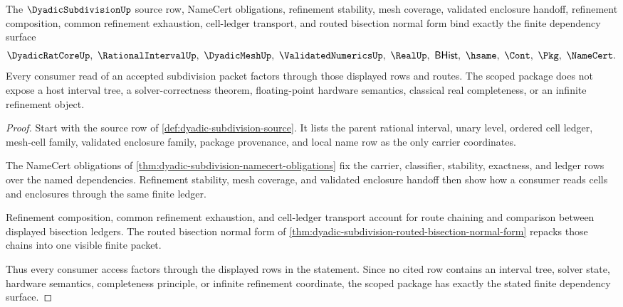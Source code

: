 \begin{theorem}
\label{thm:dyadic-subdivision-scoped-finite-route-package}
The $\DyadicSubdivisionUp$ source row, NameCert obligations, refinement stability, mesh coverage, validated enclosure handoff, refinement composition, common refinement exhaustion, cell-ledger transport, and routed bisection normal form bind exactly the finite dependency surface
$$
\DyadicRatCoreUp,\ \RationalIntervalUp,\ \DyadicMeshUp,\ \ValidatedNumericsUp,\ \RealUp,\ \mathsf{BHist},\ \hsame,\ \Cont,\ \Pkg,\ \NameCert .
$$
Every consumer read of an accepted subdivision packet factors through those displayed rows and routes. The scoped package does not expose a host interval tree, a solver-correctness theorem, floating-point hardware semantics, classical real completeness, or an infinite refinement object.
\end{theorem}
\begin{proof}
Start with the source row of \autoref{def:dyadic-subdivision-source}. It lists the parent rational interval, unary level, ordered cell ledger, mesh-cell family, validated enclosure family, package provenance, and local name row as the only carrier coordinates.

The NameCert obligations of \autoref{thm:dyadic-subdivision-namecert-obligations} fix the carrier, classifier, stability, exactness, and ledger rows over the named dependencies. Refinement stability, mesh coverage, and validated enclosure handoff then show how a consumer reads cells and enclosures through the same finite ledger.

Refinement composition, common refinement exhaustion, and cell-ledger transport account for route chaining and comparison between displayed bisection ledgers. The routed bisection normal form of \autoref{thm:dyadic-subdivision-routed-bisection-normal-form} repacks those chains into one visible finite packet.

Thus every consumer access factors through the displayed rows in the statement. Since no cited row contains an interval tree, solver state, hardware semantics, completeness principle, or infinite refinement coordinate, the scoped package has exactly the stated finite dependency surface.
\end{proof}

